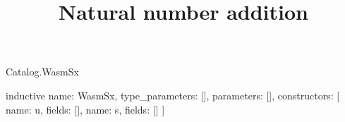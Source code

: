 \begin{lexlean}{Catalog.WasmSx}
\title{Natural number addition}
\begin{semanticmodule}
inductive{
  name: WasmSx,
  type_parameters: [],
  parameters: [],
  constructors: [
    {name: u, fields: []},
    {name: s, fields: []}
  ]
}
\end{semanticmodule}
\end{lexlean}
